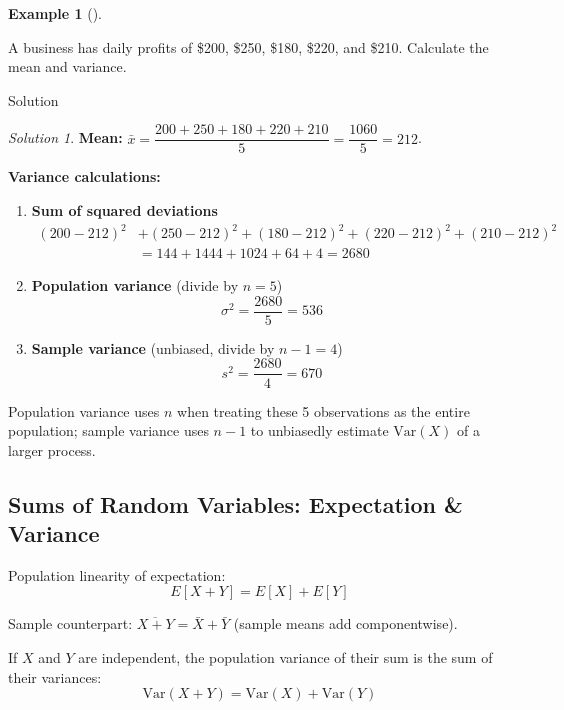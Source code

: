 \documentclass[
  12pt,
  letterpaper,
]{scrbook}
\providecommand{\tightlist}{%
  \setlength{\itemsep}{0pt}\setlength{\parskip}{0pt}}
\renewcommand{\tightlist}{\setlength{\itemsep}{0.5\baselineskip}\setlength{\parskip}{0.2\baselineskip}}
\theoremstyle{plain}
\theoremstyle{definition}
\newtheorem{example}{Example}[chapter]
\theoremstyle{remark}
\newtheorem{refsolution}{Solution}[chapter]
\begin{document}
\begin{example}[]\protect\hypertarget{exm-4}{}\label{exm-4}

A business has daily profits of {\$200, \$250, \$180, \$220, and \$210}.
Calculate the mean and variance.

\end{example}

Solution

\begin{refsolution}
\textbf{Mean:}
\(\bar{x}=\dfrac{200+250+180+220+210}{5}=\dfrac{1060}{5}=212\).

\textbf{Variance calculations:}

\begin{enumerate}
\def\labelenumi{\arabic{enumi}.}
\tightlist
\item
  \textbf{Sum of squared deviations}\\
  \[
  \begin{aligned}
  (200-212)^2 &+ (250-212)^2 + (180-212)^2 + (220-212)^2 + (210-212)^2 \\
  &= 144 + 1444 + 1024 + 64 + 4 = 2680
  \end{aligned}
  \]
\item
  \textbf{Population variance} (divide by \(n=5\))\\
  \[ \sigma^2 = \frac{2680}{5} = 536 \]
\item
  \textbf{Sample variance} (unbiased, divide by \(n-1=4\))\\
  \[ s^2 = \frac{2680}{4} = 670 \]
\end{enumerate}

Population variance uses \(n\) when treating these 5 observations as the
entire population; sample variance uses \(n-1\) to unbiasedly estimate
\(\text{Var}(X)\) of a larger process.

\label{sol-4}

\end{refsolution}

\subsection{Sums of Random Variables: Expectation \&
Variance}\label{sums-of-random-variables-expectation-variance}

Population linearity of expectation: \[
E[X + Y] = E[X] + E[Y]
\]

Sample counterpart: \(\overline{X+Y} = \bar{X} + \bar{Y}\) (sample means
add componentwise).

If \(X\) and \(Y\) are independent, the population variance of their sum
is the sum of their variances:
\[\text{Var}(X + Y) = \text{Var}(X) + \text{Var}(Y)\]
\end{document}
